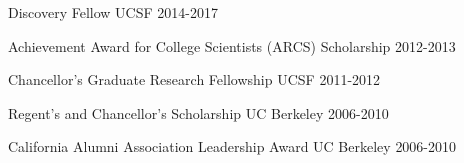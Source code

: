 

\begin{cvhonors}

  \cvhonor
  {} %
  {Discovery Fellow} %
  {UCSF} %
  {2014-2017} %

  \cvhonor
  {} %
  {Achievement Award for College Scientists (ARCS) Scholarship} %
  {} %
  {2012-2013} %

  \cvhonor
  {} %
  {Chancellor's Graduate Research Fellowship} %
  {UCSF} %
  {2011-2012} %

\end{cvhonors}



\begin{cvhonors}

  \cvhonor
  {} %
  {Regent's and Chancellor's Scholarship} %
  {UC Berkeley} %
  {2006-2010} %

  \cvhonor
  {} %
  {California Alumni Association Leadership Award} %
  {UC Berkeley} %
  {2006-2010} %

\end{cvhonors}
